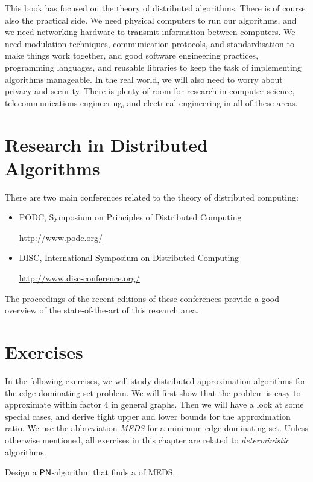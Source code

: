 This book has focused on the theory of distributed algorithms. There is of course also the practical side. We need physical computers to run our algorithms, and we need networking hardware to transmit information between computers. We need modulation techniques, communication protocols, and standardisation to make things work together, and good software engineering practices, programming languages, and reusable libraries to keep the task of implementing algorithms manageable. In the real world, we will also need to worry about privacy and security. There is plenty of room for research in computer science, telecommunications engineering, and electrical engineering in all of these areas.


\section{Research in Distributed Algorithms}

There are two main conferences related to the theory of distributed computing:
\begin{itemize}
    \item PODC, Symposium on Principles of Distributed Computing

    \url{http://www.podc.org/}
    \item DISC, International Symposium on Distributed Computing

    \url{http://www.disc-conference.org/}
\end{itemize}
The proceedings of the recent editions of these conferences provide a good overview of the state-of-the-art of this research area.


\section{Exercises}

In the following exercises, we will study distributed approximation algorithms for the edge dominating set problem. We will first show that the problem is easy to approximate within factor $4$ in general graphs. Then we will have a look at some special cases, and derive tight upper and lower bounds for the approximation ratio. We use the abbreviation \emph{MEDS} for a minimum edge dominating set. Unless otherwise mentioned, all exercises in this chapter are related to \emph{deterministic} algorithms.

\begin{ex}\label{ex:edsfirst}
    Design a $\textup{\sffamily PN}$-algorithm that finds a  of MEDS.
    
\end{ex}

